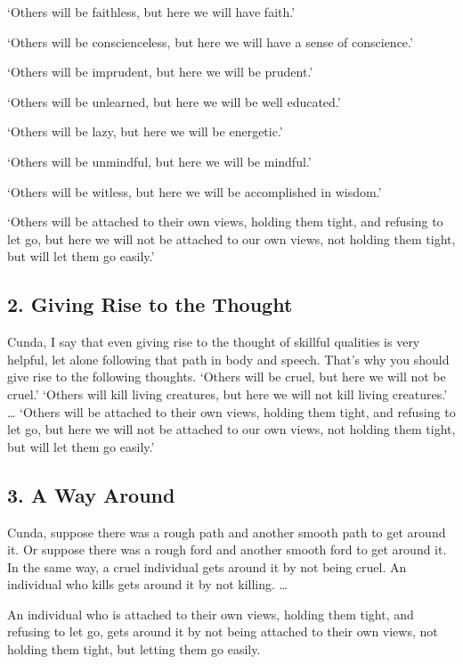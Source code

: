 \documentclass[12pt,openany]{book}%
\begin{document}
‘Others will be faithless, but here we will have faith.’ 

‘Others will be conscienceless, but here we will have a sense of conscience.’ 

‘Others will be imprudent, but here we will be prudent.’ 

‘Others will be unlearned, but here we will be well educated.’ 

‘Others will be lazy, but here we will be energetic.’ 

‘Others will be unmindful, but here we will be mindful.’ 

‘Others will be witless, but here we will be accomplished in wisdom.’ 

‘Others will be attached to their own views, holding them tight, and refusing to let go, but here we will not be attached to our own views, not holding them tight, but will let them go easily.’ 

\subsection*{2. Giving Rise to the Thought }

Cunda, I say that even giving rise to the thought of skillful qualities is very helpful, let alone following that path in body and speech. That’s why you should give rise to the following thoughts. ‘Others will be cruel, but here we will not be cruel.’ ‘Others will kill living creatures, but here we will not kill living creatures.’ … ‘Others will be attached to their own views, holding them tight, and refusing to let go, but here we will not be attached to our own views, not holding them tight, but will let them go easily.’ 

\subsection*{3. A Way Around }

Cunda, suppose there was a rough path and another smooth path to get around it. Or suppose there was a rough ford and another smooth ford to get around it. In the same way, a cruel individual gets around it by not being cruel. An individual who kills gets around it by not killing. … 

An individual who is attached to their own views, holding them tight, and refusing to let go, gets around it by not being attached to their own views, not holding them tight, but letting them go easily. 
\end{document}
